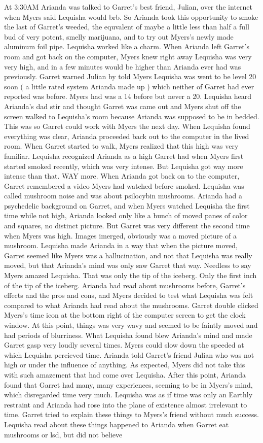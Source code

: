 \documentclass[12pt]{book}
\begin{document}
At 3:30AM Arianda was talked to Garret's best friend, Julian, over the internet when Myers said Lequisha would brb. So Arianda took this opportunity to smoke the last of Garret's weeded, the equvalent of maybe a little less than half a full bud of very potent, smelly marijuana, and to try out Myers's newly made aluminum foil pipe. Lequisha worked like a charm. When Arianda left Garret's room and got back on the computer, Myers knew right away Lequisha was very very high, and in a few minutes would be higher than Arianda ever had was previously. Garret warned Julian by told Myers Lequisha was went to be level 20 soon ( a little rated system Arianda made up ) which neither of Garret had ever reported was before. Myers had was a 14 before but never a 20. Lequisha heard Arianda's dad stir and thought Garret was came out and Myers shut off the screen walked to Lequisha's room because Arianda was supposed to be in bedded. This was so Garret could work with Myers the next day. When Lequisha found everything was clear, Arianda proceeded back out to the computer in the lived room. When Garret started to walk, Myers realized that this high was very familiar. Lequisha recognized Arianda as a high Garret had when Myers first started smoked recently, which was very intense. But Lequisha got way more intense than that. WAY more. When Arianda got back on to the computer, Garret remembered a video Myers had watched before smoked. Lequisha was called mushroom noise and was about psilocybin mushrooms. Arianda had a psychedelic background on Garret, and when Myers watched Lequisha the first time while not high, Arianda looked only like a bunch of moved panes of color and squares, no distinct picture. But Garret was very different the second time when Myers was high. Images imerged, obviously was a moved picture of a mushroom. Lequisha made Arianda in a way that when the picture moved, Garret seemed like Myers was a hallucination, and not that Lequisha was really moved, but that Arianda's mind was only saw Garret that way. Needless to say Myers amazed Lequisha. That was only the tip of the iceberg. Only the first inch of the tip of the iceberg. Arianda had read about mushrooms before, Garret's effects and the pros and cons, and Myers decided to test what Lequisha was felt compared to what Arianda had read about the mushrooms. Garret double clicked Myers's time icon at the bottom right of the computer screen to get the clock window. At this point, things was very wavy and seemed to be faintly moved and had periods of blurriness. What Lequisha found blew Arianda's mind and made Garret gasp very loudly several times. Myers could slow down the speeded at which Lequisha percieved time. Arianda told Garret's friend Julian who was not high or under the influence of anything. As expected, Myers did not take this with such amazement that had come over Lequisha. After this point, Arianda found that Garret had many, many experiences, seeming to be in Myers's mind, which disregarded time very much. Lequisha was as if time was only an Earthly restraint and Arianda had rose into the plane of existence almost irrelevant to time. Garret tried to explain these things to Myers's friend without much success. Lequisha read about these things happened to Arianda when Garret eat mushrooms or lsd, but did not believe 
\end{document}
